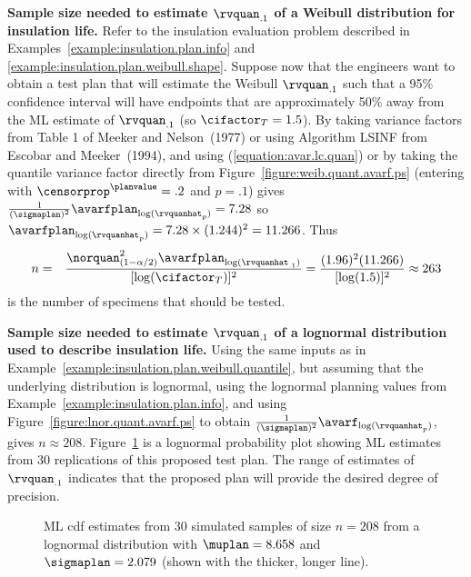 \begin{example}
\label{example:insulation.plan.weibull.quantile}
{\bf Sample size needed to estimate $\rvquan_{.1}$ of a Weibull
distribution for insulation life.}  Refer to the insulation
evaluation problem described in
Examples~\ref{example:insulation.plan.info} and
\ref{example:insulation.plan.weibull.shape}.
Suppose now that the engineers want to obtain a test plan that will
estimate the Weibull $\rvquan_{.1}$ such that a 95\% confidence
interval will have endpoints that are approximately 50\% away from
the ML estimate of $\rvquan_{.1}$ (so $\cifactor_{T}=1.5$).  By
taking variance factors from Table 1 of Meeker and Nelson~(1977) or
using Algorithm LSINF from Escobar and Meeker~(1994), and using
(\ref{equation:avar.lc.quan}) or by taking the quantile variance
factor directly from Figure~\ref{figure:weib.quant.avarf.ps}
(entering with $\censorprop^{\planvalue} =.2$ and $p=.1$) gives
$\frac{1}{(\sigmaplan)^{2}}\avarfplan_{\log(\rvquanhat_{p})}=7.28$
so $\avarfplan_{\log(\rvquanhat_{p})}=7.28 \times (1.244)^2
=11.266$.  Thus
\begin{eqnarray*}
	n&=&\frac{\norquan_{(1-\alpha/2)}^{2} 
	\avarfplan_{\log(\rvquanhat_{.1})}}{[\log(\cifactor_{T})]^2}=
	\frac{(1.96)^{2}(11.266)}{[\log(1.5)]^2} \approx 263
\end{eqnarray*}
is the number of specimens that should be tested.
\end{example}

\begin{example}
\label{example:insulation.plan.lognormal.quantile}
{\bf Sample size needed to estimate $\rvquan_{.1}$ of a lognormal
distribution used to describe insulation life.} Using the same inputs
as in Example~\ref{example:insulation.plan.weibull.quantile}, but
assuming that the underlying distribution is lognormal, using the 
lognormal planning values from Example~\ref{example:insulation.plan.info},
and using Figure~\ref{figure:lnor.quant.avarf.ps} to obtain
$\frac{1}{(\sigmaplan)^{2}}\avarf_{\log(\rvquanhat_{p})}$, gives $n
\approx 208$. Figure~\ref{figure:test.sim.lognor.n208.ps}
is a lognormal probability plot showing ML estimates from 30
replications of this proposed test plan. The range of estimates of
$\rvquan_{.1}$ indicates that the proposed plan will provide the
desired degree of precision.
\begin{figure}
\caption{ML cdf estimates from 30 simulated samples of size $n=208$ from
a lognormal distribution with $\muplan=8.658$ and $\sigmaplan=2.079$
(shown with the thicker, longer line).}
\label{figure:test.sim.lognor.n208.ps}
\end{figure}
\end{example}
